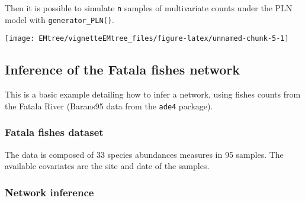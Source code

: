 Then it is possible to simulate \texttt{n} samples of multivariate
counts under the PLN model with \texttt{generator\_PLN()}.

\begin{Shaded}
\begin{Highlighting}[]
\StringTok{ }\OperatorTok{\$} \NormalTok{)}
\end{Highlighting}
\end{Shaded}

\begin{center}\texttt{[image: EMtree/vignetteEMtree\_files/figure-latex/unnamed-chunk-5-1]} \end{center}

\subsection{Inference of the Fatala fishes
network}\label{inference-of-the-fatala-fishes-network}

This is a basic example detailing how to infer a network, using fishes
counts from the Fatala River (Barans95 data from the \texttt{ade4}
package).

\subsubsection{Fatala fishes dataset}\label{fatala-fishes-dataset}

The data is composed of 33 species abundances measures in 95 samples.
The available covariates are the site and date of the samples.

\begin{Shaded}
\begin{Highlighting}[]
\StringTok{ }\OperatorTok{\$}
\StringTok{ }\OperatorTok{\$}
\StringTok{ }
\StringTok{ }
\end{Highlighting}
\end{Shaded}

\subsubsection{Network inference}\label{network-inference}

